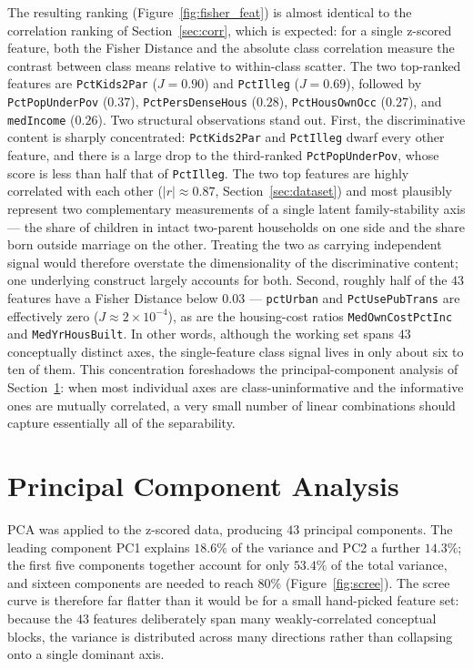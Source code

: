 \documentclass{ieeeaccess}
\begin{document}
The resulting ranking (Figure~\ref{fig:fisher_feat}) is almost identical to the correlation ranking of Section~\ref{sec:corr}, which is expected: for a single z-scored feature, both the Fisher Distance and the absolute class correlation measure the contrast between class means relative to within-class scatter. The two top-ranked features are \texttt{PctKids2Par} ($J\!=\!0.90$) and \texttt{PctIlleg} ($J\!=\!0.69$), followed by \texttt{PctPopUnderPov} ($0.37$), \texttt{PctPersDenseHous} ($0.28$), \texttt{PctHousOwnOcc} ($0.27$), and \texttt{medIncome} ($0.26$). Two structural observations stand out. First, the discriminative content is sharply concentrated: \texttt{PctKids2Par} and \texttt{PctIlleg} dwarf every other feature, and there is a large drop to the third-ranked \texttt{PctPopUnderPov}, whose score is less than half that of \texttt{PctIlleg}. The two top features are highly correlated with each other ($|r|\approx 0.87$, Section~\ref{sec:dataset}) and most plausibly represent two complementary measurements of a single latent family-stability axis --- the share of children in intact two-parent households on one side and the share born outside marriage on the other. Treating the two as carrying independent signal would therefore overstate the dimensionality of the discriminative content; one underlying construct largely accounts for both. Second, roughly half of the $43$ features have a Fisher Distance below $0.03$ --- \texttt{pctUrban} and \texttt{PctUsePubTrans} are effectively zero ($J\approx 2\times 10^{-4}$), as are the housing-cost ratios \texttt{MedOwnCostPctInc} and \texttt{MedYrHousBuilt}. In other words, although the working set spans $43$ conceptually distinct axes, the single-feature class signal lives in only about six to ten of them. This concentration foreshadows the principal-component analysis of Section~\ref{sec:pca}: when most individual axes are class-uninformative and the informative ones are mutually correlated, a very small number of linear combinations should capture essentially all of the separability.

\section{Principal Component Analysis}
\label{sec:pca}
PCA \cite{jolliffe} was applied to the z-scored data, producing $43$ principal components. The leading component PC1 explains $18.6\%$ of the variance and PC2 a further $14.3\%$; the first five components together account for only $53.4\%$ of the total variance, and sixteen components are needed to reach $80\%$ (Figure~\ref{fig:scree}). The scree curve is therefore far flatter than it would be for a small hand-picked feature set: because the $43$ features deliberately span many weakly-correlated conceptual blocks, the variance is distributed across many directions rather than collapsing onto a single dominant axis.
\end{document}
